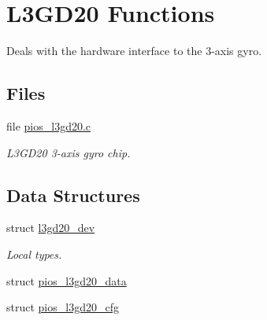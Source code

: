 \hypertarget{group___p_i_o_s___l3_g_d20}{\section{L3\-G\-D20 Functions}
\label{group___p_i_o_s___l3_g_d20}
}


Deals with the hardware interface to the 3-\/axis gyro.  


\subsection*{Files}
\begin{DoxyCompactItemize}
\item 
file \hyperlink{pios__l3gd20_8c}{pios\-\_\-l3gd20.\-c}
\begin{DoxyCompactList}\small\item\em L3\-G\-D20 3-\/axis gyro chip. \end{DoxyCompactList}\end{DoxyCompactItemize}
\subsection*{Data Structures}
\begin{DoxyCompactItemize}
\item 
struct \hyperlink{structl3gd20__dev}{l3gd20\-\_\-dev}
\begin{DoxyCompactList}\small\item\em Local types. \end{DoxyCompactList}\item 
struct \hyperlink{structpios__l3gd20__data}{pios\-\_\-l3gd20\-\_\-data}
\item 
struct \hyperlink{structpios__l3gd20__cfg}{pios\-\_\-l3gd20\-\_\-cfg}
\end{DoxyCompactItemize}
